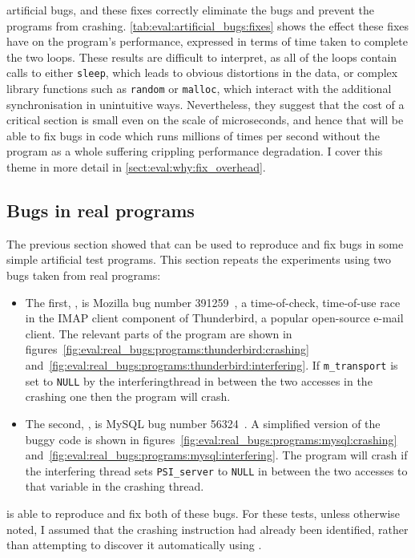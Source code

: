 artificial bugs, and these fixes correctly eliminate the bugs and
prevent the programs from crashing.
\autoref{tab:eval:artificial_bugs:fixes} shows the effect these fixes
have on the program's performance, expressed in terms of time taken to
complete the two loops.  These results are difficult to interpret, as
all of the loops contain calls to either \texttt{sleep}, which leads
to obvious distortions in the data, or complex library functions such
as \texttt{random} or \texttt{malloc}, which interact with the
additional synchronisation in unintuitive ways.  Nevertheless, they
suggest that the cost of a {\technique} critical section is small even
on the scale of microseconds, and hence that {\technique} will be able
to fix bugs in code which runs millions of times per second without
the program as a whole suffering crippling performance degradation.  I
cover this theme in more detail in
\autoref{sect:eval:why:fix_overhead}.

\subsection{Bugs in real programs}
\label{sect:eval:does:real}

The previous section showed that {\implementation} can be used to reproduce
and fix bugs in some simple artificial test programs.  This section
repeats the experiments using two bugs taken from real programs:
\begin{itemize}
\item The first, , is Mozilla bug number
  391259~\cite{FFFMery2007}, a time-of-check, time-of-use race in the
  IMAP client component of Thunderbird, a popular open-source e-mail
  client.  The relevant parts of the program are shown in
  figures~\ref{fig:eval:real_bugs:programs:thunderbird:crashing}
  and~\ref{fig:eval:real_bugs:programs:thunderbird:interfering}.  If
  \verb|m_transport| is set to \verb|NULL| by the
  \gls{interferingthread} in between the two accesses in the crashing
  one then the program will crash.
\item The second, , is MySQL bug number
  56324~\cite{FFFCorreia2010}.  A simplified version of the buggy code
  is shown in figures~\ref{fig:eval:real_bugs:programs:mysql:crashing}
  and~\ref{fig:eval:real_bugs:programs:mysql:interfering}.  The
  program will crash if the interfering thread sets
  \texttt{PSI\_server} to \texttt{NULL} in between the two accesses to
  that variable in the crashing thread.
\end{itemize}
{\implementation} is able to reproduce and fix both of these bugs.  For
these tests, unless otherwise noted, I assumed that the crashing
instruction had already been identified, rather than attempting to
discover it automatically using {\technique}.

